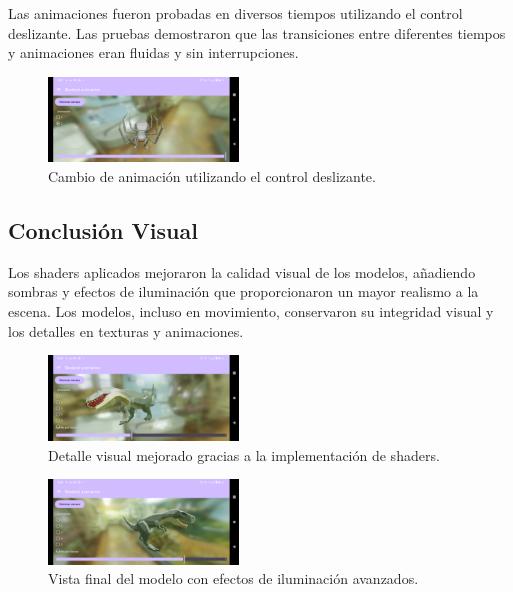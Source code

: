 \documentclass[conference]{IEEEtran}
\begin{document}
Las animaciones fueron probadas en diversos tiempos utilizando el control deslizante. Las pruebas demostraron que las transiciones entre diferentes tiempos y animaciones eran fluidas y sin interrupciones.

\begin{figure}[H]
    \centering
    \includegraphics[width=0.45\textwidth]{img/Captura_13.png}
    \caption{Cambio de animación utilizando el control deslizante.}
    \label{fig:control_animacion}
\end{figure}

\subsection{Conclusión Visual}

Los shaders aplicados mejoraron la calidad visual de los modelos, añadiendo sombras y efectos de iluminación que proporcionaron un mayor realismo a la escena. Los modelos, incluso en movimiento, conservaron su integridad visual y los detalles en texturas y animaciones.

\begin{figure}[H]
    \centering
    \includegraphics[width=0.45\textwidth]{img/Captura_7.png}
    \caption{Detalle visual mejorado gracias a la implementación de shaders.}
    \label{fig:detalle_visual}
\end{figure}

\begin{figure}[H]
    \centering
    \includegraphics[width=0.45\textwidth]{img/Captura_8.png}
    \caption{Vista final del modelo con efectos de iluminación avanzados.}
    \label{fig:iluminacion_avanzada}
\end{figure}
\end{document}
